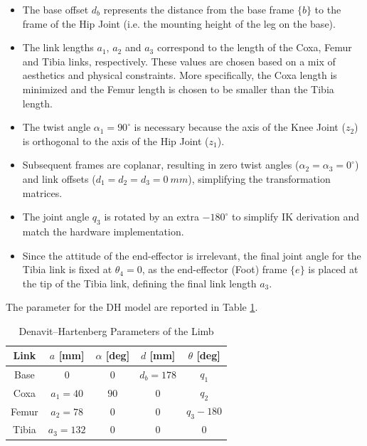 \begin{itemize}
    \item The base offset $d_b$ represents the distance from the base frame $\{b\}$ to the frame of the Hip Joint
        (i.e. the mounting height of the leg on the base).
    \item The link lengths $a_1$, $a_2$ and $a_3$ correspond to the length of the Coxa, Femur and Tibia links,
        respectively. These values are chosen based on a mix of aesthetics and physical constraints. More
        specifically, the Coxa length is minimized and the Femur length is chosen to be smaller than the Tibia
        length.
    \item The twist angle $\alpha_1 = 90^{\circ}$ is necessary because the axis of the Knee Joint ($z_2$) is
        orthogonal to the axis of the Hip Joint ($z_1$).
    \item Subsequent frames are coplanar, resulting in zero twist angles ($\alpha_2 = \alpha_3 = 0^{\circ}$)
        and link offsets ($d_1 = d_2 = d_3 = 0\ mm$), simplifying the transformation matrices.
    \item The joint angle $q_3$ is rotated by an extra $-180^\circ$ to simplify IK derivation and match the
        hardware implementation.
    \item Since the attitude of the end-effector is irrelevant, the final joint angle for the Tibia link is
        fixed at $\theta_4 = 0$, as the end-effector (Foot) frame $\{e\}$ is placed at the tip of the Tibia
        link, defining the final link length $a_3$.
\end{itemize}

The parameter for the DH model are reported in Table \ref{tab:dh_parameters}.

\begin{table}[htbp]
    \centering
    \begin{tabular}{c c c c c}
        \hline
        \textbf{Link} & \textbf{$a$ [mm]} & \textbf{$\alpha$ [deg]} & \textbf{$d$ [mm]} & \textbf{$\theta$ [deg]} \\
        \hline
        \hline
        Base    & $0$           & $0$   & $d_b = 178$   & $q_1$         \\
        Coxa    & $a_1 = 40$    & $90$  & $0$           & $q_2$         \\
        Femur   & $a_2 = 78$    & $0$   & $0$           & $q_3 - 180$   \\
        Tibia   & $a_3 = 132$   & $0$   & $0$           & $0$           \\
        \hline
    \end{tabular}
    \caption{Denavit--Hartenberg Parameters of the Limb}
    \label{tab:dh_parameters}
\end{table}


